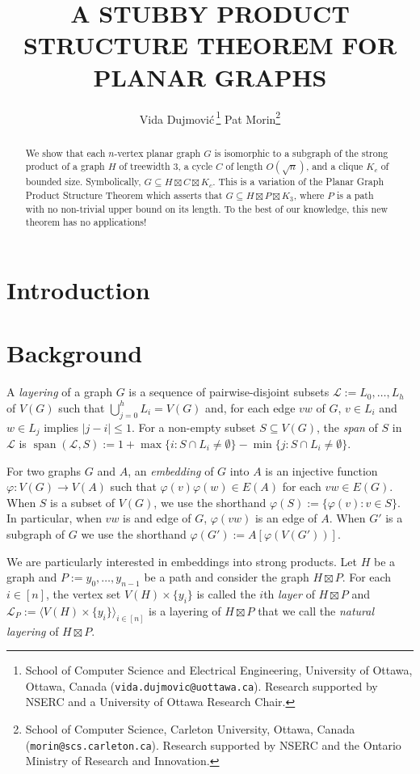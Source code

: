 \documentclass{patmorin}
\title{\MakeUppercase{\boldmath A Stubby Product Structure Theorem for Planar Graphs}}
\author{
 Vida Dujmovi{\'c}\,\footnote{School of Computer Science and Electrical Engineering, University of Ottawa, Ottawa, Canada (\texttt{vida.dujmovic@uottawa.ca}). Research supported by NSERC and a University of Ottawa Research Chair.}
 \qquad
 Pat Morin\footnote{School of Computer Science, Carleton University, Ottawa, Canada (\texttt{morin@scs.carleton.ca}). Research supported by NSERC and the Ontario Ministry of Research and Innovation.}
 }
\date{}
\newcommand{\defin}[1]{\emph{\textcolor{brightmaroon}{#1}}}
\DeclareMathOperator{\spn}{span}
\begin{document}
\maketitle

\begin{abstract}
  We show that each $n$-vertex planar graph $G$ is isomorphic to a subgraph of the strong product of a graph $H$ of treewidth $3$, a cycle $C$ of length $O(\sqrt{n})$, and a clique $K_c$ of bounded size.  Symbolically, $G\subseteq H\boxtimes C\boxtimes K_c$. This is a variation of the Planar Graph Product Structure Theorem which asserts that $G\subseteq H\boxtimes P\boxtimes K_3$, where $P$ is a path with no non-trivial upper bound on its length.  To the best of our knowledge, this new theorem has no applications!
\end{abstract}

\section{Introduction}



\section{Background}

A \defin{layering} of a graph $G$ is a sequence of pairwise-disjoint subsets $\mathcal{L}:=L_0,\ldots,L_h$ of $V(G)$ such that $\bigcup_{j=0}^h L_i=V(G)$ and, for each edge $vw$ of $G$, $v\in L_i$ and $w\in L_j$ implies $|j-i|\le 1$.  For a non-empty subset $S\subseteq V(G)$, the \defin{span} of $S$ in $\mathcal{L}$ is $\spn(\mathcal{L},S):=1+\max\{i:S\cap L_i\neq\emptyset\}-\min\{j:S\cap L_i\neq\emptyset\}$.


For two graphs $G$ and $A$, an \defin{embedding} of $G$ into $A$ is an injective function $\varphi:V(G)\to V(A)$ such that $\varphi(v)\varphi(w)\in E(A)$ for each $vw\in E(G)$.  When $S$ is a subset of $V(G)$, we use the shorthand $\varphi(S):=\{\varphi(v):v\in S\}$.  In particular, when $vw$ is and edge of $G$, $\varphi(vw)$ is an edge of $A$.  When $G'$ is a subgraph of $G$ we use the shorthand $\varphi(G'):=A[\varphi(V(G'))]$.

We are particularly interested in embeddings into strong products.  Let $H$ be a graph and $P:=y_0,\ldots,y_{n-1}$ be a path and consider the graph $H\boxtimes P$.  For each $i\in[n]$, the vertex set $V(H)\times\{y_i\}$ is called the $i$th \defin{layer} of $H\boxtimes P$ and $\mathcal{L}_P:=\langle V(H)\times\{y_i\} \rangle_{i\in[n]}$ is a layering of $H\boxtimes P$ that we call the \defin{natural layering} of $H\boxtimes P$.
\end{document}
